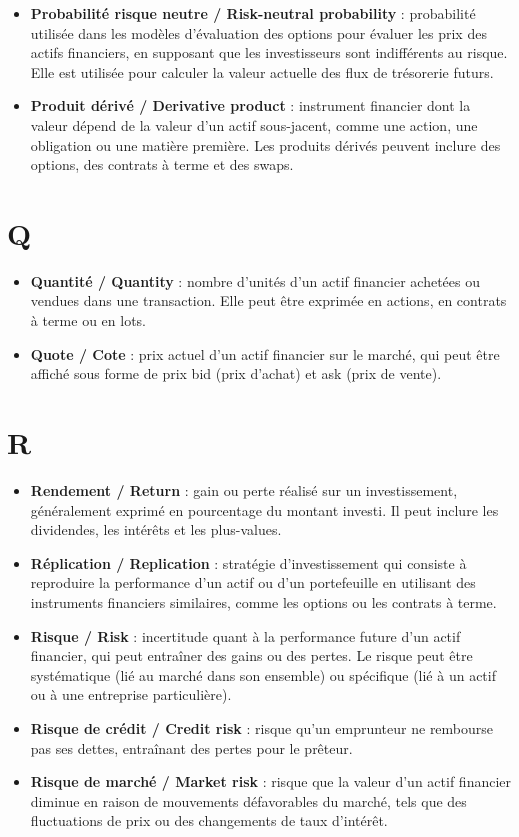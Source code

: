 \documentclass[a4paper,10pt]{article}
\begin{document}
\begin{multicols}{2}
\begin{itemize}
  \item \textbf{Probabilité risque neutre / Risk-neutral probability} : probabilité utilisée dans les modèles d’évaluation des options pour évaluer les prix des actifs financiers, en supposant que les investisseurs sont indifférents au risque. Elle est utilisée pour calculer la valeur actuelle des flux de trésorerie futurs.
  \item \textbf{Produit dérivé / Derivative product} : instrument financier dont la valeur dépend de la valeur d’un actif sous-jacent, comme une action, une obligation ou une matière première. Les produits dérivés peuvent inclure des options, des contrats à terme et des swaps.
\end{itemize}

\section*{Q}
\begin{itemize}
  \item \textbf{Quantité / Quantity} : nombre d’unités d’un actif financier achetées ou vendues dans une transaction. Elle peut être exprimée en actions, en contrats à terme ou en lots.
  \item \textbf{Quote / Cote} : prix actuel d’un actif financier sur le marché, qui peut être affiché sous forme de prix bid (prix d’achat) et ask (prix de vente).
\end{itemize}

\section*{R}
\begin{itemize}
  \item \textbf{Rendement / Return} : gain ou perte réalisé sur un investissement, généralement exprimé en pourcentage du montant investi. Il peut inclure les dividendes, les intérêts et les plus-values.
  \item \textbf{Réplication / Replication} : stratégie d’investissement qui consiste à reproduire la performance d’un actif ou d’un portefeuille en utilisant des instruments financiers similaires, comme les options ou les contrats à terme.
  \item \textbf{Risque / Risk} : incertitude quant à la performance future d’un actif financier, qui peut entraîner des gains ou des pertes. Le risque peut être systématique (lié au marché dans son ensemble) ou spécifique (lié à un actif ou à une entreprise particulière).
  \item \textbf{Risque de crédit / Credit risk} : risque qu’un emprunteur ne rembourse pas ses dettes, entraînant des pertes pour le prêteur.
  \item \textbf{Risque de marché / Market risk} : risque que la valeur d’un actif financier diminue en raison de mouvements défavorables du marché, tels que des fluctuations de prix ou des changements de taux d’intérêt.
\end{itemize}


\end{multicols}
\end{document}
